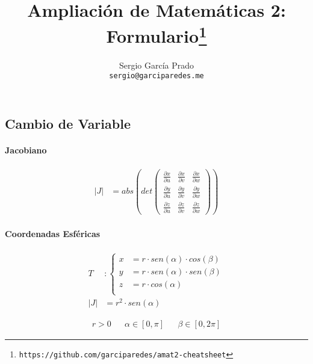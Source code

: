 \documentclass{article}
\title{Ampliación de Matemáticas 2: Formulario\footnote{\texttt{https://github.com/garciparedes/amat2-cheatsheet}}}
\author{Sergio García Prado \\ \texttt{sergio@garciparedes.me}}
\begin{document}

  \maketitle

  \begin{multicols}{2}


    \section{Cambio de Variable}

      \paragraph{Jacobiano}

      \begin{align*}
        \left|J\right| &= abs\left(det\left(
          \begin{array}{ccc}
            \frac{\partial x}{\partial u} & \frac{\partial x}{\partial v} & \frac{\partial x}{\partial w} \\
            \frac{\partial y}{\partial u} & \frac{\partial y}{\partial v} & \frac{\partial y}{\partial w} \\
            \frac{\partial z}{\partial u} & \frac{\partial z}{\partial v} & \frac{\partial z}{\partial w}
          \end{array}
        \right)\right)
      \end{align*}


      \paragraph{Coordenadas Esféricas}

        \begin{align*}
          T &:
          \begin{cases}
            x &= r \cdot sen(\alpha) \cdot cos(\beta) \\
            y &= r \cdot sen(\alpha) \cdot sen(\beta) \\
            z &= r \cdot cos(\alpha) \\
          \end{cases} \\
          \left|J\right| &= r ^ 2 \cdot sen(\alpha)
        \end{align*}

        \begin{align*}
          r > 0 && \alpha \in[0,\pi]&& \beta \in [0,2\pi]
        \end{align*}


\end{multicols}
\end{document}
